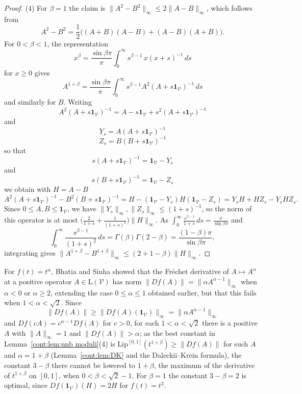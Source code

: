 \begin{proof}
(4) For $\beta=1$ the claim is $\|A^2-B^2\|_\infty\leq2\|A-B\|_\infty$, which follows from
\[
A^2-B^2=\frac12\big((A+B)(A-B)+(A-B)(A+B)\big).
\]
For $0<\beta<1$, the representation \[x^\beta=\frac{\sin\beta\pi}{\pi}\int_0^\infty s^{\beta-1}\,x(x+s)^{-1}\,ds\] for $x\geq0$ \cite[Chapter~V]{bhatia1997matrix} gives \[A^{1+\beta}=\frac{\sin\beta\pi}{\pi}\int_0^\infty s^{\beta-1}A^2(A+s\mathbf{1}_{\mathcal{V}})^{-1}\,ds\] and similarly for $B$. Writing \[A^2(A+s\mathbf{1}_{\mathcal{V}})^{-1}=A-s\mathbf{1}_{\mathcal{V}}+s^2(A+s\mathbf{1}_{\mathcal{V}})^{-1}\] and \[Y_s=A(A+s\mathbf{1}_{\mathcal{V}})^{-1}\] \[Z_s=B(B+s\mathbf{1}_{\mathcal{V}})^{-1}\] so that \[s(A+s\mathbf{1}_{\mathcal{V}})^{-1}=\mathbf{1}_{\mathcal{V}}-Y_s\] and \[s(B+s\mathbf{1}_{\mathcal{V}})^{-1}=\mathbf{1}_{\mathcal{V}}-Z_s\] we obtain with $H=A-B$
\[
A^2(A+s\mathbf{1}_{\mathcal{V}})^{-1}-B^2(B+s\mathbf{1}_{\mathcal{V}})^{-1}=H-(\mathbf{1}_{\mathcal{V}}-Y_s)H(\mathbf{1}_{\mathcal{V}}-Z_s)=Y_sH+HZ_s-Y_sHZ_s .
\]
Since $0\leq A,B\leq\mathbf{1}_{\mathcal{V}}$, we have $\|Y_s\|_\infty,\|Z_s\|_\infty\leq(1+s)^{-1}$, so the norm of this operator is at most $\big(\frac{2}{1+s}+\frac{1}{(1+s)^2}\big)\|H\|_\infty$. As $\int_0^\infty\frac{s^{\beta-1}}{1+s}\,ds=\frac{\pi}{\sin\beta\pi}$ and
\[
\int_0^\infty\frac{s^{\beta-1}}{(1+s)^2}\,ds=\Gamma(\beta)\Gamma(2-\beta)=\frac{(1-\beta)\pi}{\sin\beta\pi},
\]
integrating gives $\|A^{1+\beta}-B^{1+\beta}\|_\infty\leq(2+1-\beta)\|H\|_\infty$.
\end{proof}

\begin{remark}\label{cont:rem:bhatia sinha}
For $f(t)=t^\alpha$, Bhatia and Sinha \cite{BhatiaSinha1994} showed that the Fr\'echet derivative of $A\mapsto A^\alpha$ at a positive operator $A\in\mathrm{L}(\mathcal{V})$ has norm $\|Df(A)\|=\|\alpha A^{\alpha-1}\|_\infty$ when $\alpha<0$ or $\alpha\geq2$, extending the case $0\leq\alpha\leq1$ obtained earlier, but that this fails when $1<\alpha<\sqrt2$. Since
\[
\|Df(A)\|\geq\|Df(A)(\mathbf{1}_{\mathcal{V}})\|_\infty=\|\alpha A^{\alpha-1}\|_\infty
\]
and $Df(cA)=c^{\alpha-1}Df(A)$ for $c>0$, for each $1<\alpha<\sqrt2$ there is a positive $A$ with $\|A\|_\infty=1$ and $\|Df(A)\|>\alpha$; as the best constant in Lemma~\ref{cont:lem:unb moduli}(4) is $\mathrm{Lip}^{[0,1]}(t^{1+\beta})\geq\|Df(A)\|$ for such $A$ and $\alpha=1+\beta$ (Lemma~\ref{cont:lem:DK} and the Daleckii--Krein formula), the constant $3-\beta$ there cannot be lowered to $1+\beta$, the maximum of the derivative of $t^{1+\beta}$ on $[0,1]$, when $0<\beta<\sqrt2-1$. For $\beta=1$ the constant $3-\beta=2$ is optimal, since $Df(\mathbf{1}_{\mathcal{V}})(H)=2H$ for $f(t)=t^2$.
\end{remark}

